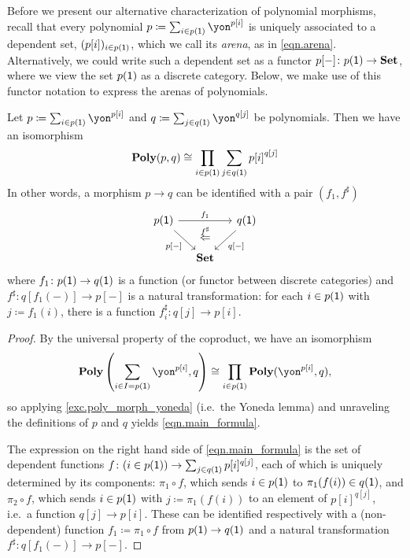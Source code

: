 \documentclass[Book-Poly]{subfiles}
\begin{document}
Before we present our alternative characterization of polynomial morphisms, recall that every polynomial $p \coloneqq \sum_{i \in p(\1)} \yon^{p[i]}$ is uniquely associated to a dependent set, $(p[i])_{i \in p(\textsf{1})}$, which we call its \emph{arena}, as in \eqref{eqn.arena}.
Alternatively, we could write such a dependent set as a functor $p[-] \colon p(\textsf{1}) \to \textbf{Set}$, where we view the set $p(\textsf{1})$ as a discrete category.
Below, we make use of this functor notation to express the arenas of polynomials.

\begin{proposition}\label{prop.poly_maps_prod_sum}
Let $p\coloneqq\sum_{i\in p(\1)}\yon^{p[i]}$ and $q\coloneqq\sum_{j\in q(\1)}\yon^{q[j]}$ be polynomials.
Then we have an isomorphism
\begin{equation}\label{eqn.main_formula}
\textbf{Poly}(p,q)\cong\prod_{i\in p(\textsf{1})}\sum_{j\in q(\textsf{1})}{p[i]}^{q[j]}
\end{equation}
In other words, a morphism $p\to q$ can be identified with a pair $(f_1,f^\sharp)$
\begin{equation}\label{eqn.colax_poly_map}
\begin{tikzcd}[column sep=small]
	p(\1)\ar[dr, "p{[-]}"']\ar[rr, "f_1"]&~&
	q(\1)\ar[dl, "q{[-]}"]\\&
	\smset\ar[u, phantom, near end, "\overset{f^\sharp}{\Leftarrow}"]
\end{tikzcd}
\end{equation}
where $f_1 \colon p(\textsf{1}) \to q(\textsf{1})$ is a function (or functor between discrete categories) and $f^\sharp \colon q[f_1(-)] \to p[-]$ is a natural transformation: for each $i\in p(\textsf{1})$ with $j\coloneqq f_1(i)$, there is a function $f^\sharp_i\colon q[j]\to p[i]$. %
\end{proposition}
\begin{proof}
By the universal property of the coproduct, we have an isomorphism
\[
    \poly\left(\sum_{i \in I=p(\1)}\yon^{p[i]}, q\right) \iso \prod_{i \in p(\1)} \poly(\yon^{p[i]}, q),
\]
so applying \cref{exc.poly_morph_yoneda} (i.e.\ the Yoneda lemma) and unraveling the definitions of $p$ and $q$ yields \eqref{eqn.main_formula}.

The expression on the right hand side of \eqref{eqn.main_formula} is the set of dependent functions $f \colon (i \in p(\textsf{1})) \to \sum_{j \in q(\textsf{1})} p[i]^{q[j]}$, each of which is uniquely determined by its components: $\pi_1 \circ f$, which sends $i \in p(\textsf{1})$ to $\pi_1(f(i)) \in q(\textsf{1})$, and $\pi_2 \circ f$, which sends $i \in p(\textsf{1})$ with $j \coloneqq \pi_1(f(i))$ to an element of $p[i]^{q[j]}$, i.e.\ a function $q[j] \to p[i]$.
These can be identified respectively with a (non-dependent) function $f_1 \coloneqq \pi_1 \circ f$ from $p(\textsf{1}) \to q(\textsf{1})$ and a natural transformation $f^\sharp \colon q[f_1(-)] \to p[-]$.
\end{proof}
\end{document}
